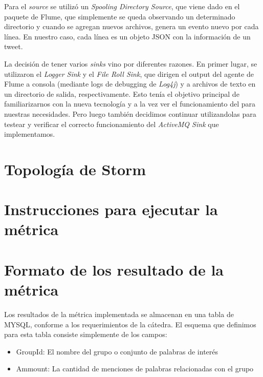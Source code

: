 \documentclass[a4paper,10pt]{article}
\begin{document}
Para el \textit{source} se utilizó un \textit{Spooling Directory Source}, que viene dado en el paquete de Flume, que simplemente se queda observando un 
determinado directorio y cuando se agregan nuevos archivos, genera un evento nuevo por cada línea. En nuestro caso, cada línea es un objeto JSON con la información de un tweet.

La decisión de tener varios \textit{sinks} vino por diferentes razones. En primer lugar, se utilizaron el \textit{Logger Sink} y el \textit{File Roll Sink}, que dirigen el output
del agente de Flume a consola (mediante logs de debugging de \textit{Log4j}) y a archivos de texto en un directorio de salida, respectivamente. Esto tenía el objetivo principal de
familiarizarnos con la nueva tecnología y a la vez ver el funcionamiento del  para nuestras necesidades. Pero luego también decidimos continuar 
utilizandolas para testear y verificar el correcto funcionamiento del \textit{ActiveMQ Sink} que implementamos.

\section{Topología de Storm}


\section{Instrucciones para ejecutar la métrica}

\small
\section{Formato de los resultado de la métrica}

Los resultados de la métrica implementada se almacenan en una tabla de MYSQL, conforme a los requerimientos de la cátedra. El esquema que definimos para esta tabla consiste 
simplemente de los campos:

\begin{itemize}
    \item GroupId: El nombre del grupo o conjunto de palabras de interés
    \item Ammount: La cantidad de menciones de palabras relacionadas con el grupo
\end{itemize}
\end{document}
